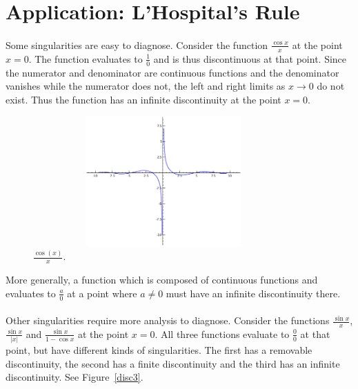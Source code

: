



\section{Application: L'Hospital's Rule}

\paragraph{}
Some singularities are easy to diagnose.  Consider the function 
$\frac{\cos x}{x}$ at the point $x = 0$.  The function evaluates to 
$\frac{1}{0}$ and is thus discontinuous at that point.  Since the numerator
and denominator are continuous functions and the denominator vanishes while
the numerator does not, the left and right limits as $x \to 0$ do not 
exist.  Thus the function has an infinite discontinuity at the point
$x = 0$.  

\begin{figure}[h!]
\begin{minipage}{\textwidth}
\begin{center}
\includegraphics[height=5cm,width=10cm]{cosoverx.eps}
\end{center}
\end{minipage}
\caption{$\frac{\cos(x)}{x}$.}
\label{fig:cosoverx}
\end{figure}

\noindent
More generally, a function which is composed of continuous
functions and evaluates to $\frac{a}{0}$ at a point where $a \neq 0$ must
have an infinite discontinuity there.

\paragraph{}
Other singularities require more analysis to diagnose.  Consider the 
functions $\frac{\sin x}{x}$, $\frac{\sin x}{|x|}$ and 
$\frac{\sin x}{1 - \cos x}$ at the point $x = 0$.  All three functions
evaluate to $\frac{0}{0}$ at that point, but have different kinds
of singularities.  The first has a removable discontinuity, the second has
a finite discontinuity and the third has an infinite discontinuity.
See Figure~\ref{disc3}.

